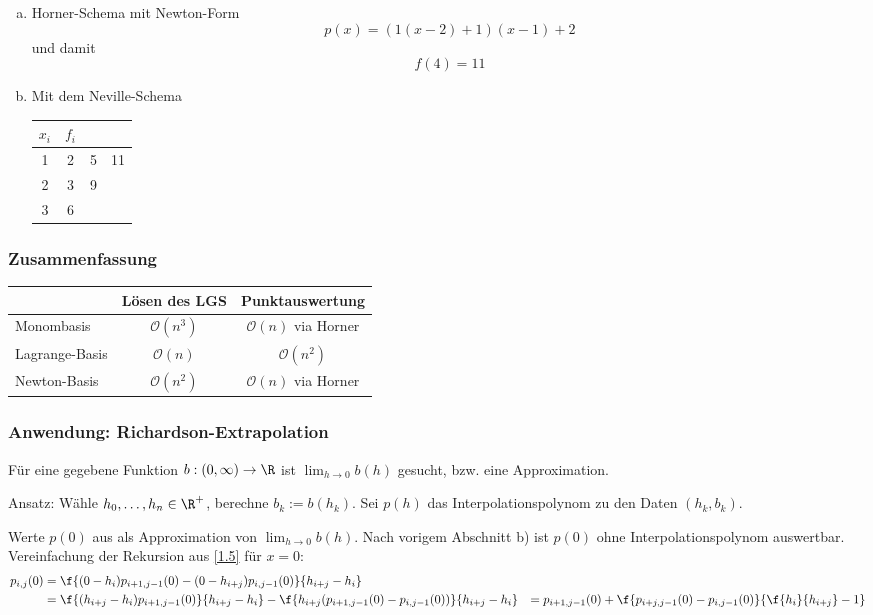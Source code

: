 \documentclass[a4paper,11pt]{scrartcl}
\begin{document}
\begin{ex*}
	\begin{enumerate}[a)]
		\item 
			Horner-Schema mit Newton-Form
			\[
				p(x) = (1(x-2)+1)(x-1) +2
			\]
			und damit
			\[
				f(4) = 11
			\]
		\item
			Mit dem Neville-Schema
			\begin{tabular}{cccc}
				$x_i$ & $f_i$ &  & \\ \hline
				1 & 2 & 5 & 11\\
				2 & 3 & 9\\
				3 & 6
			\end{tabular}
	\end{enumerate}
\end{ex*}

\subsubsection{Zusammenfassung}

\begin{tabular}{l|c|c}
	 & Lösen des LGS & Punktauswertung\\ \hline
	 Monombasis  & $\mathcal O(n^3)$ & $\mathcal O(n)$ via Horner \\ \hline
	 Lagrange-Basis & $\mathcal O(n)$ & $\mathcal O(n^2)$ \\ \hline
	 Newton-Basis & $\mathcal O(n^2)$ & $\mathcal O(n)$ via Horner
\end{tabular}

\subsubsection{Anwendung: Richardson-Extrapolation}

Für eine gegebene Funktion $b:(0,\infty)\to \R$ ist $\lim_{h\to 0} b(h)$ gesucht, bzw. eine Approximation.

\begin{seg}{Ansatz:}
Wähle $h_0,\dotsc, h_n \in \R^+$, berechne $b_k := b(h_k)$.
Sei $p(h)$ das Interpolationspolynom zu den Daten $(h_k,b_k)$.

Werte $p(0)$ aus als Approximation von $\lim_{h\to 0} b(h)$.
Nach vorigem Abschnitt b) ist $p(0)$ ohne Interpolationspolynom auswertbar.
Vereinfachung der Rekursion aus \ref{1.5} für $x=0$:
\begin{align*}
	p_{i,j}(0) &= \f {(0-h_i)p_{i+1,j-1}(0) - (0-h_{i+j})p_{i,j-1}(0)}{h_{i+j}-h_i} \\
	&= \f {(h_{i+j}-h_i)p_{i+1,j-1}(0)}{h_{i+j}-h_i} - \f {h_{i+j}(p_{i+1,j-1}(0)-p_{i,j-1}(0))}{h_{i+j}-h_i}
	&= p_{i+1,j-1}(0) + \f {p_{i+j,j-1}(0) -p_{i,j-1}(0)}{\f {h_i}{h_{i+j}} - 1}
\end{align*}
\end{seg}
\end{document}
